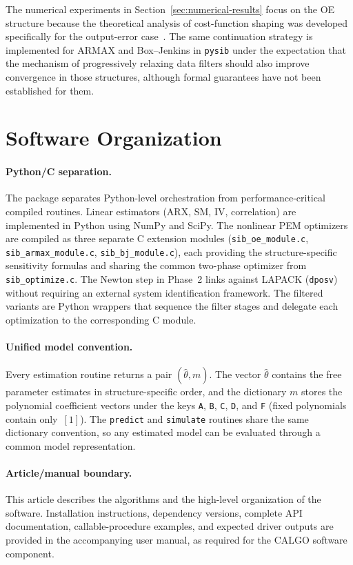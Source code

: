 \documentclass{ifacconf}
\begin{document}
The numerical experiments in
Section~\ref{sec:numerical-results} focus on the OE structure because
the theoretical analysis of cost-function shaping was developed
specifically for the output-error
case~\cite{eckhard2013input,eckhard2017cost}.
The same continuation strategy is implemented for ARMAX and
Box--Jenkins in \texttt{pysib} under the expectation that the mechanism
of progressively relaxing data filters should also improve convergence
in those structures, although formal guarantees have not been
established for them.

\section{Software Organization}
\label{sec:software-organization}

\paragraph*{Python/C separation.}
The package separates Python-level orchestration from performance-critical
compiled routines.  Linear estimators (ARX, SM, IV, correlation) are
implemented in Python using NumPy and SciPy.  The nonlinear PEM optimizers
are compiled as three separate C extension modules
(\texttt{sib\_oe\_module.c}, \texttt{sib\_armax\_module.c},
\texttt{sib\_bj\_module.c}), each providing the structure-specific
sensitivity formulas and sharing the common two-phase optimizer from
\texttt{sib\_optimize.c}.  The Newton step in Phase~2 links against
LAPACK (\texttt{dposv}) without requiring an external system identification
framework.  The filtered variants are Python wrappers that sequence the
filter stages and delegate each optimization to the corresponding C module.

\paragraph*{Unified model convention.}
Every estimation routine returns a pair $(\hat\theta, m)$.
The vector $\hat\theta$ contains the free parameter estimates in
structure-specific order, and the dictionary $m$ stores the polynomial
coefficient vectors under the keys \texttt{A}, \texttt{B}, \texttt{C},
\texttt{D}, and \texttt{F} (fixed polynomials contain only~$[1]$).
The \texttt{predict} and \texttt{simulate} routines share the same
dictionary convention, so any estimated model can be evaluated through
a common model representation.

\paragraph*{Article/manual boundary.}
This article describes the algorithms and the high-level organization of
the software.  Installation instructions, dependency versions, complete API
documentation, callable-procedure examples, and expected driver outputs are
provided in the accompanying user manual, as required for the CALGO software
component.
\end{document}
